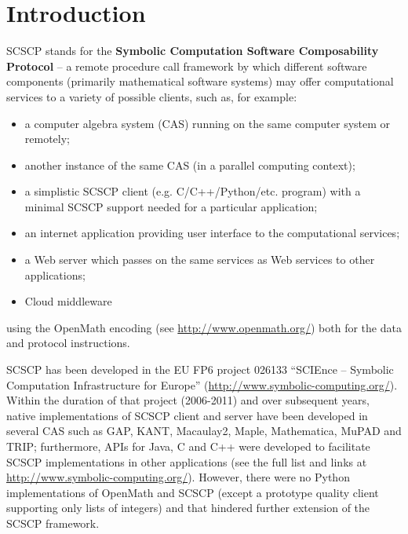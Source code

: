 \documentclass{deliverablereport}
\author{Luca De Feo, Alexander Konovalov, Steve Linton, Tom Wiesing}
\begin{document}
\maketitle
%
\strut\githubissuedescription
\newpage\tableofcontents\newpage

\section{Introduction}\label{intro}

{\sf SCSCP} stands for the 
{\bf Symbolic Computation Software Composability Protocol}
-- a remote procedure call framework by which different
software components (primarily mathematical software systems) 
may offer computational services to a variety of possible
clients, such as, for example:
\begin{itemize}
\item a computer algebra system (CAS) running on the same computer system or remotely;
\item another instance of the same CAS (in a parallel computing context);
\item a simplistic SCSCP client (e.g. C/C++/Python/etc. program) with a minimal 
SCSCP support needed for a particular application;
\item an internet application providing user interface to the computational services;
\item a Web server which passes on the same services as Web services to other applications;
\item Cloud middleware
\end{itemize}
using the OpenMath encoding (see \url{http://www.openmath.org/})
both for the data and protocol instructions. 

SCSCP has been developed in the EU FP6 project 026133 
``SCIEnce -- Symbolic Computation Infrastructure for Europe''
(\url{http://www.symbolic-computing.org/}).
Within the duration of that project (2006-2011) and over subsequent
years, native implementations of SCSCP client and server have been developed in
several CAS such as GAP, KANT, Macaulay2, Maple, Mathematica, MuPAD
and TRIP; furthermore, APIs for Java, C and C++ were developed
to facilitate SCSCP implementations in other applications
(see the full list and links at \url{http://www.symbolic-computing.org/}).
However, there were no Python implementations of OpenMath and SCSCP 
(except a prototype quality client supporting only lists of integers)
and that hindered further extension of the SCSCP framework.
\end{document}
